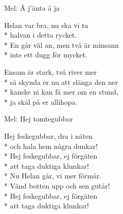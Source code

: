 \begin{SongText}
    \begin{SongInfo}
        Mel: Å j’änta å ja
    \end{SongInfo}
    \begin{SongVerse}
        Helan var bra, nu ska vi ta\\*%
        halvan i detta rycket.\\*%
        En går väl an, men två är minsann\\*%
        inte ett dugg för mycket.
    \end{SongVerse}
    \begin{SongVerse}
        Ensam är stark, två river mer\\*%
        så skynda er nu att slänga den ner\\*%
        kanske ni kan få mer om en stund,\\*%
        ja skål på er allihopa.
    \end{SongVerse}
\end{SongText}
\begin{SongText}
    \begin{SongInfo}
        Mel: Hej tomtegubbar
    \end{SongInfo}
    \begin{SongVerse}
        Hej feskegubbar, dra i näten\\*%
        och hala hem några dunkar!\\*%
        Hej feskegubbar, ej förgäten\\*%
        att taga duktiga klunkar!\\*%
        Nu Helan går, vi mer förmår.\\*%
        Vänd botten upp och sen gutår!\\*%
        Hej feskegubbar, ej förgäten\\*%
        att taga duktiga klunkar!
    \end{SongVerse}
\end{SongText}
